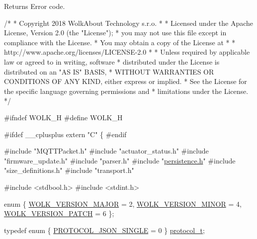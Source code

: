 \begin{DoxyReturn}{Returns}
Error code.
\end{DoxyReturn}

\begin{DoxyCodeInclude}
\textcolor{comment}{/*}
\textcolor{comment}{ * Copyright 2018 WolkAbout Technology s.r.o.}
\textcolor{comment}{ *}
\textcolor{comment}{ * Licensed under the Apache License, Version 2.0 (the "License");}
\textcolor{comment}{ * you may not use this file except in compliance with the License.}
\textcolor{comment}{ * You may obtain a copy of the License at}
\textcolor{comment}{ *}
\textcolor{comment}{ *      http://www.apache.org/licenses/LICENSE-2.0}
\textcolor{comment}{ *}
\textcolor{comment}{ * Unless required by applicable law or agreed to in writing, software}
\textcolor{comment}{ * distributed under the License is distributed on an "AS IS" BASIS,}
\textcolor{comment}{ * WITHOUT WARRANTIES OR CONDITIONS OF ANY KIND, either express or implied.}
\textcolor{comment}{ * See the License for the specific language governing permissions and}
\textcolor{comment}{ * limitations under the License.}
\textcolor{comment}{ */}

\textcolor{preprocessor}{#ifndef WOLK\_H}
\textcolor{preprocessor}{#define WOLK\_H}

\textcolor{preprocessor}{#ifdef \_\_cplusplus}
\textcolor{keyword}{extern} \textcolor{stringliteral}{"C"} \{
\textcolor{preprocessor}{#endif}

\textcolor{preprocessor}{#include "MQTTPacket.h"}
\textcolor{preprocessor}{#include "actuator\_status.h"}
\textcolor{preprocessor}{#include "firmware\_update.h"}
\textcolor{preprocessor}{#include "parser.h"}
\textcolor{preprocessor}{#include "\hyperlink{persistence_8h}{persistence.h}"}
\textcolor{preprocessor}{#include "size\_definitions.h"}
\textcolor{preprocessor}{#include "transport.h"}

\textcolor{preprocessor}{#include <stdbool.h>}
\textcolor{preprocessor}{#include <stdint.h>}

\textcolor{keyword}{enum} \{ \hyperlink{wolk__connector_8h_a06fc87d81c62e9abb8790b6e5713c55ba447aa6141eb0f03228f39d152985b062}{WOLK\_VERSION\_MAJOR} = 2, \hyperlink{wolk__connector_8h_a06fc87d81c62e9abb8790b6e5713c55ba969b4fa8b86e732fd734fad63a85c3da}{WOLK\_VERSION\_MINOR} = 4, 
      \hyperlink{wolk__connector_8h_a06fc87d81c62e9abb8790b6e5713c55ba747cdd3ba3df6a7a9813b05b06c698e0}{WOLK\_VERSION\_PATCH} = 6 \};

\textcolor{keyword}{typedef} \textcolor{keyword}{enum} \{ \hyperlink{wolk__connector_8h_a91e19fa4fff461493e1a41f7c7aa4e5fa9574b7cae2523f47c59e082e473223bd}{PROTOCOL\_JSON\_SINGLE} = 0 \} \hyperlink{wolk__connector_8h_a91e19fa4fff461493e1a41f7c7aa4e5f}{protocol\_t};


\end{DoxyCodeInclude}
